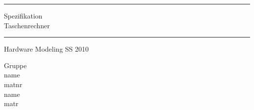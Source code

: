 \documentclass[a4paper,12pt]{article}
\newcommand\HRule{\noindent\rule{\linewidth}{1.5pt}}
\begin{document}
\begin{titlepage}
    \HRule
    \begin{center}
        \LARGE Spezifikation \\ 
        Taschenrechner
    \end{center}
    \HRule
    \begin{center}
        \Large Hardware Modeling SS 2010 \\
        
     \end{center}
    \begin{center}
        \large Gruppe  \\
        \vspace{30pt}
        \normalsize name \\
        matnr \\
        \vspace{15pt}
        name \\
        matr
     \end{center}
 \end{titlepage}
\end{document}
